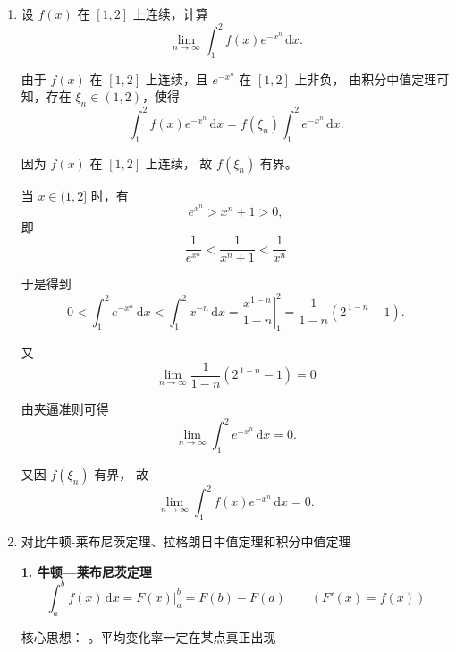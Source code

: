 \documentclass[../book.tex]{subfiles}
\begin{document}
    \begin{enumerate}
        \item 设 $f(x)$ 在 $[1,2]$ 上连续，计算
        \[
            \lim_{n\to\infty}\int_{1}^{2} f(x)e^{-x^{n}}\,\mathrm{d}x.
        \]

        \begin{analysisbox}[Example]
            由于 $f(x)$ 在 $[1,2]$ 上连续，且 $e^{-x^n}$ 在 $[1,2]$ 上非负，
            由积分中值定理可知，存在 $\xi_n \in (1,2)$，使得
            \[
                \int_{1}^{2} f(x)e^{-x^n}\,\mathrm{d}x
                =
                f(\xi_n)\int_{1}^{2} e^{-x^n}\,\mathrm{d}x.
            \]

            因为 $f(x)$ 在 $[1,2]$ 上连续，
            故 $f(\xi_n)$ 有界。

            当 $x\in(1,2]$ 时，有
            \[
                e^{x^n} > x^n + 1 > 0,
            \]
            即
            \[
                \frac{1}{e^{x^n}} < \frac{1}{x^n + 1} < \frac{1}{x^n}
            \]

            于是得到
            \[
                0
                <
                \int_{1}^{2} e^{-x^n}\,\mathrm{d}x
                <
                \int_{1}^{2} x^{-n}\,\mathrm{d}x =
                \left.
                    \frac{x^{1-n}}{1-n}
                \right|_{1}^{2}
                =
                \frac{1}{1-n}\left(2^{\,1-n}-1\right).
            \]

            又
            \[
                \lim_{n\to\infty} \frac{1}{1-n}\left(2^{\,1-n}-1\right) = 0
            \]

            由夹逼准则可得
            \[
                \lim_{n\to\infty}\int_{1}^{2} e^{-x^n}\,\mathrm{d}x = 0.
            \]

            又因 $f(\xi_n)$ 有界，
            故
            \[
                \lim_{n\to\infty}
                \int_{1}^{2} f(x)e^{-x^n}\,\mathrm{d}x
                =
                0.
            \]

        \end{analysisbox}
        \item 对比牛顿-莱布尼茨定理、拉格朗日中值定理和积分中值定理
        \begin{analysisbox}
            \textbf{1. 牛顿—莱布尼茨定理}
            \[
                \int_a^b f(x)\,\mathrm{d}x = F(x)\Big|_a^b = F(b)-F(a) \qquad (F'(x)=f(x))
            \]

            核心思想： {\color{red}{积分 = 增量}}。平均变化率一定在某点真正出现


\end{analysisbox}
\end{enumerate}
\end{document}
